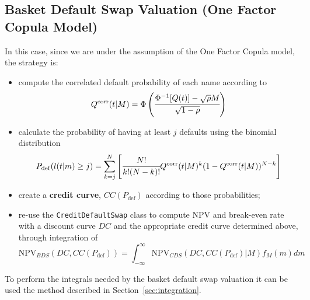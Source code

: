 \subsection{Basket Default Swap Valuation (One Factor Copula Model)}
\label{basket-cds-valuation-under-market-standard-model}

In this case, since we are under the assumption of the One Factor Copula model, the strategy is:
\begin{itemize}
\item compute the correlated default probability of each name according to 
\begin{equation}
Q^{\textrm{corr}}(t|M) = \Phi\left(\cfrac{\Phi^{-1}[Q(t)]-\sqrt{\rho} M}{\sqrt{1-\rho}}\right)
\end{equation}
\item calculate the probability of having at least $j$ defaults using the binomial distribution
\begin{equation}
P_{\mathrm{def}}(l(t|m) \ge j) = \sum_{k=j}^{N}\left[  \cfrac{N!}{k!(N-k)!}Q^{\textrm{corr}}(t|M)^k(1-Q^{\textrm{corr}}(t|M))^{N-k}\right]
\end{equation}
\item create a \textbf{credit curve}, $CC(P_{\mathrm{def}})$ according to those probabilities;
\item re-use the \texttt{CreditDefaultSwap} class to compute NPV and break-even rate with a discount curve $DC$ and the appropriate credit curve determined above, through integration of
\begin{equation}
\mathrm{NPV}_{BDS}(DC, CC(P_{\mathrm{def}})) = \int_{-\infty}^{\infty}{\mathrm{NPV}_{CDS}(DC, CC(P_{\mathrm{def}})|M) f_M(m)dm} 
\end{equation}
\end{itemize}

To perform the integrals needed by the basket default swap valuation it can be used the method described in Section~\ref{sec:integration}.

